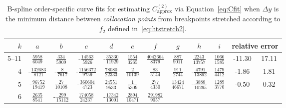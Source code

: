 \begin{sidewaystable}
\centering
\caption[
    B-spline order-specific curve fits for $C_\text{approx}^{(2)}$
    for stretching~\eqref{eq:htstretch2}.
]{%
    B-spline order-specific curve fits for estimating $C_\text{approx}^{(2)}$
    via Equation~\eqref{eq:Cfit} when $\Delta{}y$ is the minimum distance
    between \emph{collocation points} from breakpoints stretched according
    to $f_2$ defined in~\eqref{eq:htstretch2}.
}
\label{tab:C2fit2}
\vspace{1em}
\renewcommand{\arraystretch}{1.40}   %
\begin{tabular}{r|ccccccccc|c@{ -- }c@{\%}}
 $k$ & $a$ & $b$ & $c$ & $d$ & $e$ & $f$ & $g$ & $h$ & $i$
     & \multicolumn{2}{c}{relative error}
\\ \hline
5--11
&  $\frac{            5958}{            6049}$
&  $\frac{             334}{            5909}$
& -$\frac{           14563}{            5926}$
& -$\frac{           35330}{           11929}$
&  $\frac{            1554}{            3265}$
&  $\frac{         4042664}{            8379}$
&  $\frac{             887}{            9011}$
&  $\frac{            2243}{           13757}$
&  $\frac{            1066}{            1585}$
&  -11.30 &  17.11
\\
4
& -$\frac{          132683}{            8121}$
& -$\frac{               8}{            7617}$
& -$\frac{         1156372}{            9759}$
&  $\frac{           78080}{           22333}$
&  $\frac{               2}{           10139}$
&  $\frac{              83}{            5144}$
&  $\frac{             911}{            2744}$
& -$\frac{            4791}{           13862}$
&  $\frac{            1479}{            4412}$
&  -1.86 &  1.81
\\
5
& -$\frac{           96752}{           19419}$
&  $\frac{              27}{           10108}$
& -$\frac{          360604}{            4723}$
&  $\frac{           24551}{            9533}$
&  $\frac{               1}{            5309}$
&  $\frac{             277}{            4330}$
&  $\frac{           13424}{           46671}$
& -$\frac{            3888}{           10265}$
&  $\frac{            1289}{            3770}$
&  -0.50 &  0.32
\\
6
&  $\frac{            2635}{            8541}$
& -$\frac{             299}{           15112}$
&  $\frac{          174058}{           24237}$
& -$\frac{           17342}{           13001}$
&  $\frac{            2894}{           10471}$
&  $\frac{          291982}{            9057}$

\end{tabular}
\end{sidewaystable}
